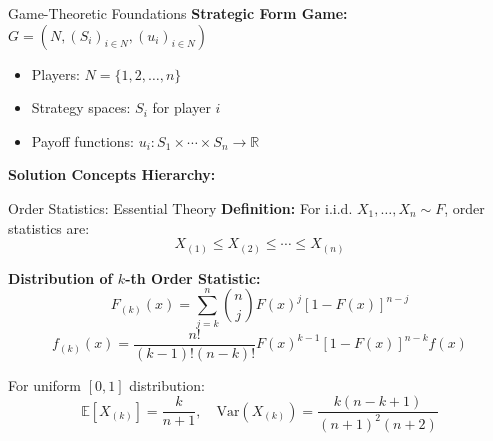 \documentclass[xcolor={x11names}]{beamer}
\newcommand{\E}{\mathbb{E}}
\begin{document}
\begin{frame}{Game-Theoretic Foundations}
\textbf{Strategic Form Game:} $G = (N, (S_i)_{i \in N}, (u_i)_{i \in N})$
\begin{itemize}
  \item Players: $N = \{1, 2, \ldots, n\}$
  \item Strategy spaces: $S_i$ for player $i$
  \item Payoff functions: $u_i: S_1 \times \cdots \times S_n \to \mathbb{R}$
\end{itemize}

\textbf{Solution Concepts Hierarchy:}
\begin{center}
\end{center}
\end{frame}

\begin{frame}{Order Statistics: Essential Theory}
\textbf{Definition:} For i.i.d. $X_1, \ldots, X_n \sim F$, order statistics are:
\[X_{(1)} \leq X_{(2)} \leq \cdots \leq X_{(n)}\]

\textbf{Distribution of $k$-th Order Statistic:}
\[F_{(k)}(x) = \sum_{j=k}^n \binom{n}{j} F(x)^j [1-F(x)]^{n-j}\]
\[f_{(k)}(x) = \frac{n!}{(k-1)!(n-k)!} F(x)^{k-1}[1-F(x)]^{n-k}f(x)\]

\begin{tcolorbox}[colback=blue!5!white,colframe=blue!75!black,title=Key Result for Auctions]
For uniform $[0,1]$ distribution:
\[\E[X_{(k)}] = \frac{k}{n+1}, \quad \text{Var}(X_{(k)}) = \frac{k(n-k+1)}{(n+1)^2(n+2)}\]
\end{tcolorbox}
\end{frame}
\end{document}
